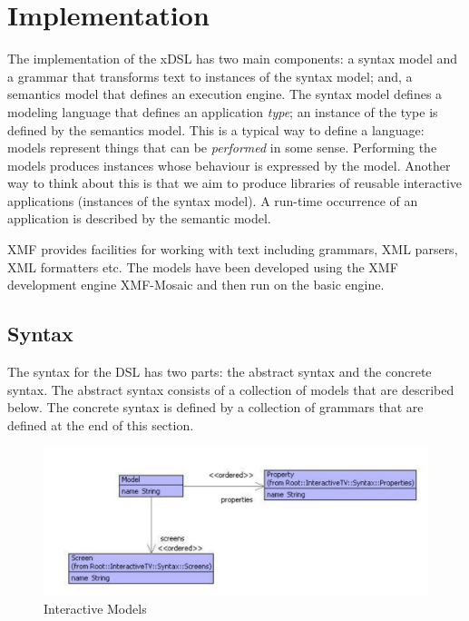 \section{Implementation\label{sec:Implementation}}

The implementation of the xDSL has two main components: a syntax model
and a grammar that transforms text to instances of the syntax model;
and, a semantics model that defines an execution engine. The syntax
model defines a modeling language that defines an application \emph{type};
an instance of the type is defined by the semantics model. This is
a typical way to define a language: models represent things that can
be \emph{performed} in some sense. Performing the models produces
instances whose behaviour is expressed by the model. Another way to
think about this is that we aim to produce libraries of reusable interactive
applications (instances of the syntax model). A run-time occurrence
of an application is described by the semantic model.

XMF provides facilities for working with text including grammars,
XML parsers, XML formatters etc. The models have been developed using
the XMF development engine XMF-Mosaic and then run on the basic engine.


\subsection{Syntax}

The syntax for the DSL has two parts: the abstract syntax and the
concrete syntax. The abstract syntax consists of a collection of models
that are described below. The concrete syntax is defined by a collection
of grammars that are defined at the end of this section.

%
\begin{figure}
\begin{center}

\includegraphics[width=12cm]{LanguageEngineering/Interactive/Images/Models}

\caption{Interactive Models\label{fig:Interactive-Models}}

\end{center}
\end{figure}


